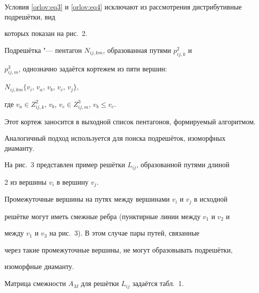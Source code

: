 Условия \eqref{orlov:eq3} и \eqref{orlov:eq4} исключают из рассмотрения дистрибутивные подрешётки, вид

которых показан на рис.~2.









Подрешётка "--- пентагон $N_{ij,km}$, образованная путями $p_{ij,k}^2$ и

$p_{ij,m}^3$, однозначно задаётся кортежем из пяти вершин:

$

N_{ij,km} \{ v_i ,\,v_a ,\,v_b ,\,v_c ,\,v_j \},

$

где  $v_a \in Z_{ij,k}^2$, $v_b$, $v_c \in Z_{ij,m}^3$, $v_b

\le v_c$.

Этот кортеж заносится в выходной список пентагонов, формируемый алгоритмом.





Аналогичный подход используется для поиска подрешёток, изоморфных диаманту.

На рис.~3 представлен пример решётки $L_{ij}$, образованной путями длиной

2 из вершины $v_i$ в вершину $v_j$.

Промежуточные вершины на путях между вершинами $v_i$ и $v_j$ в исходной

решётке могут иметь смежные ребра (пунктирные линии между $v_1$ и $v_2$ и

между $v_1$ и $v_3$ на рис.~3). В этом случае пары путей, связанные

через такие промежуточные вершины, не могут образовывать подрешётки,

изоморфные диаманту.

Матрица смежности $A_M$ для решётки $L_{ij}$ задаётся табл.~1.



